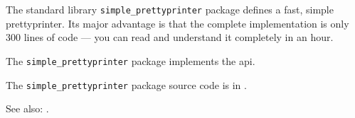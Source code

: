 
The standard library {\tt simple\_prettyprinter} package defines 
a fast, simple prettyprinter.  Its major advantage is that 
the complete implementation is only 300 lines of code --- you 
can read and understand it completely in an hour.

The {\tt simple\_prettyprinter} package implements the  api.

The {\tt simple\_prettyprinter} package source code is in .

See also: .






